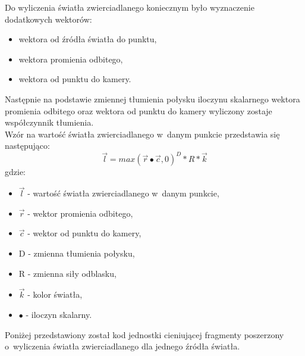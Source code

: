 \documentclass[a4paper,twoside,12pt]{book}
\begin{document}
\begin{itemize}
    Do wyliczenia światła zwierciadlanego koniecznym było wyznaczenie dodatkowych wektorów:
    \begin{itemize}
        \item wektora od źródła światła do punktu,
        \item wektora promienia odbitego,
        \item wektora od punktu do kamery.
    \end{itemize}
    Następnie na podstawie zmiennej tłumienia połysku iloczynu skalarnego wektora promienia odbitego oraz wektora od punktu do kamery wyliczony zostaje współczynnik tłumienia. \\
    Wzór na wartość światła zwierciadlanego w~danym punkcie przedstawia się następująco:
    \begin{equation}
        \vec{l} = max(\vec{r} \bullet \vec{c}, 0)^{D} * R * \vec{k}
    \end{equation}
    gdzie:
    \begin{itemize}
        \item $\vec{l}$ - wartość światła zwierciadlanego w~danym punkcie,
        \item $\vec{r}$ - wektor promienia odbitego,
        \item $\vec{c}$ - wektor od punktu do kamery,
        \item D - zmienna tłumienia połysku,
        \item R - zmienna siły odblasku,
        \item $\vec{k}$ - kolor światła,
        \item $\bullet$ - iloczyn skalarny.
    \end{itemize}
    
    Poniżej przedstawiony został kod jednostki cieniującej fragmenty poszerzony o~wyliczenia światła zwierciadlanego dla jednego źródła światła. \\
    
    
    
    
    
    

\end{itemize}
\end{document}
